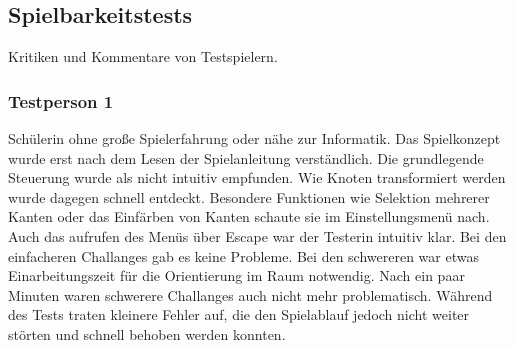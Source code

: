 %



\newpage



\label{Abschnitt:Tests:Protokoll:Abnahme}



\subsection*{Spielbarkeitstests}

Kritiken und Kommentare von Testspielern.\\



\subsubsection*{Testperson 1}

Schülerin ohne große Spielerfahrung oder nähe zur Informatik. Das Spielkonzept wurde erst nach dem Lesen der Spielanleitung verständlich. Die grundlegende Steuerung wurde als nicht intuitiv empfunden. Wie Knoten transformiert werden wurde dagegen schnell entdeckt. Besondere Funktionen wie Selektion mehrerer Kanten oder das Einfärben von Kanten schaute sie im Einstellungsmenü nach. Auch das aufrufen des Menüs über Escape war der Testerin intuitiv klar. Bei den einfacheren Challanges gab es keine Probleme. Bei den schwereren war etwas Einarbeitungszeit für die Orientierung im Raum notwendig. Nach ein paar Minuten waren schwerere Challanges auch nicht mehr problematisch. Während des Tests traten kleinere Fehler auf, die den Spielablauf jedoch nicht weiter störten und schnell behoben werden konnten. %






